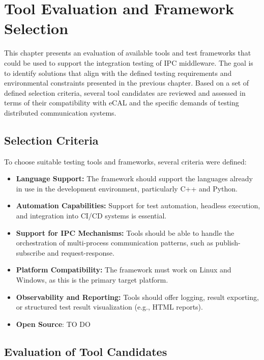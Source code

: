 \clearpage
\section{Tool Evaluation and Framework Selection}

This chapter presents an evaluation of available tools and test frameworks that could be used to support the integration testing of IPC middleware. The goal is to identify solutions that align with the defined testing requirements and environmental constraints presented in the previous chapter. Based on a set of defined selection criteria, several tool candidates are reviewed and assessed in terms of their compatibility with eCAL and the specific demands of testing distributed communication systems.

\subsection{Selection Criteria}

To choose suitable testing tools and frameworks, several criteria were defined:

\begin{itemize}
	\item \textbf{Language Support:} The framework should support the languages already in use in the development environment, particularly C++ and Python.
	\item \textbf{Automation Capabilities:} Support for test automation, headless execution, and integration into CI/CD systems is essential.
	\item \textbf{Support for IPC Mechanisms:} Tools should be able to handle the orchestration of multi-process communication patterns, such as publish-subscribe and request-response.
	\item \textbf{Platform Compatibility:} The framework must work on Linux and Windows, as this is the primary target platform.
	\item \textbf{Observability and Reporting:} Tools should offer logging, result exporting, or structured test result visualization (e.g., HTML reports).
	\item \textbf{Open Source}: TO DO
\end{itemize}

\newpage
\subsection{Evaluation of Tool Candidates}

